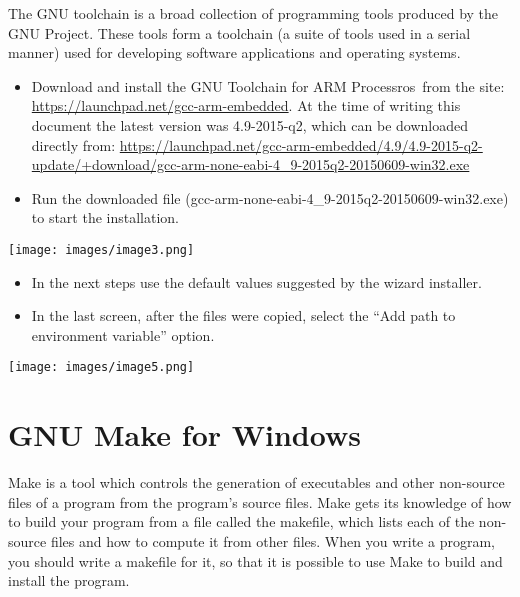 {The GNU toolchain is a broad collection of programming tools produced
by the GNU Project. These tools form a toolchain (a suite of tools used
in a serial manner) used for developing software applications and
operating systems.}

\begin{itemize}
\tightlist
\item
  {Download and install the }{GNU Toolchain for ARM Processros}{~from
  the site:
  }{\href{https://www.google.com/url?q=https://launchpad.net/gcc-arm-embedded\&sa=D\&ust=1511275046369000\&usg=AFQjCNGxWGT_YonUxM4BFF9geho0LfeKww}{https://launchpad.net/gcc-arm-embedded}}{.
  At the time of writing this document the latest version was
  4.9-2015-q2, which can be downloaded directly from:
  }{\href{https://www.google.com/url?q=https://launchpad.net/gcc-arm-embedded/4.9/4.9-2015-q2-update/\%2Bdownload/gcc-arm-none-eabi-4_9-2015q2-20150609-win32.exe\&sa=D\&ust=1511275046369000\&usg=AFQjCNHgw7yb_djkKsPe-rUggiSx6ZpV-Q}{https://launchpad.net/gcc-arm-embedded/4.9/4.9-2015-q2-update/+download/gcc-arm-none-eabi-4\_9-2015q2-20150609-win32.exe}}
\item
  {Run the downloaded file
  (gcc-arm-none-eabi-4\_9-2015q2-20150609-win32.exe) to start the
  installation.}
\end{itemize}

{\texttt{[image: images/image3.png]}}

\begin{itemize}
\tightlist
\item
  {In the next steps use the default values suggested by the wizard
  installer.}
\item
  {In the last screen, after the files were copied, select the ``Add
  path to environment variable'' option. }
\end{itemize}

{\texttt{[image: images/image5.png]}}

\hypertarget{h.1fob9te}{\section{\texorpdfstring{{GNU Make for
Windows}}{GNU Make for Windows}}\label{h.1fob9te}}

{Make is a tool which controls the generation of executables and other
non-source files of a program from the program's source files. Make gets
its knowledge of how to build your program from a file called the
makefile, which lists each of the non-source files and how to compute it
from other files. When you write a program, you should write a makefile
for it, so that it is possible to use Make to build and install the
program.}

